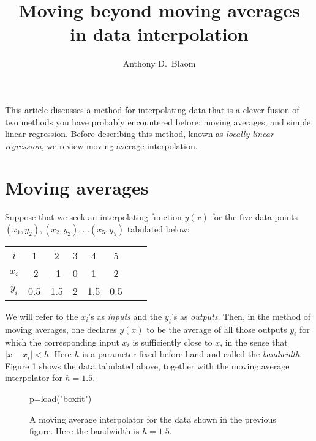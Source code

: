 \documentclass[11pt, reqno]{amsart}
\newcommand\df{\em}
\begin{document}
 
\author{Anthony D.~Blaom}
\title[Beyond moving averages]{Moving beyond moving averages \\in data
  interpolation}
\maketitle

This article discusses a method for interpolating data that is a
clever fusion of two methods you have probably encountered before:
moving averages, and simple linear regression. Before describing this
method, known as {\df locally linear regression}, we review moving
average interpolation.

\section{Moving averages}\label{section1}
Suppose that we seek an interpolating function $y(x)$ for the five data
points $(x_1,y_2), (x_2, y_2), \ldots (x_5,y_5)$ tabulated below:
\vspace{0.75\baselineskip}
\begin{center}
\begin{tabular}{c|c c c c c c c}
     $i$ & 1 & 2 & 3 & 4 & 5 \\
     $x_i$ & -2 & -1 & 0 & 1 & 2 \\ 
     $y_i$  &  0.5 & 1.5 & 2 & 1.5 & 0.5 
\end{tabular}
\end{center}
\vspace{0.75\baselineskip}

\noindent We will refer to the $x_i$'s as {\df inputs} and the $y_i$'s
as {\df outputs}. Then, in the method of moving averages, one declares
$y(x)$ to be the average of all those outputs $y_i$ for which the
corresponding input $x_i$ is sufficiently close to $x$, in the sense
that $|x-x_i|<h$. Here $h$ is a parameter fixed before-hand and called
the {\df bandwidth}. Figure 1 shows the data tabulated above,
together with the moving average interpolator for $h=1.5$.

\begin{figure}\label{figtwo}
  \begin{sagesilent}
     p=load("boxfit")
  \end{sagesilent}
  \centering 
  \caption{{} A moving average interpolator for the data shown in the
    previous figure. Here the bandwidth is $h=1.5$.}
\end{figure}
\end{document}
